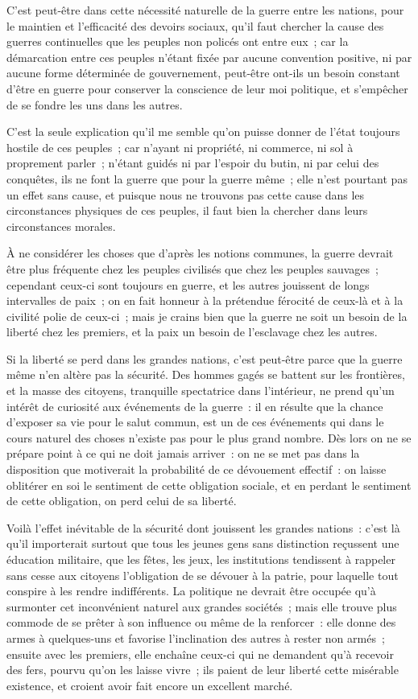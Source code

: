\documentclass[french,twoside]{book} %
\begin{document}
C’est peut-être dans cette nécessité naturelle de la guerre entre les nations, pour le maintien et l’efficacité des devoirs sociaux, qu’il faut chercher la cause des guerres continuelles que les peuples non policés ont entre eux ; car la démarcation entre ces peuples n’étant fixée par aucune convention positive, ni par aucune forme déterminée de gouvernement, peut-être ont-ils un besoin constant d’être en guerre pour conserver la conscience de leur moi politique, et s’empêcher de se fondre les uns dans les autres.\par
C’est la seule explication qu’il me semble qu’on puisse donner de l’état toujours hostile de ces peuples ; car n’ayant ni propriété, ni commerce, ni sol à proprement parler ; n’étant guidés ni par l’espoir du butin, ni par celui des conquêtes, ils ne font la guerre que pour la guerre même ; elle n’est pourtant pas un effet sans cause, et puisque nous ne trouvons pas cette cause dans les circonstances physiques de ces peuples, il faut bien la chercher dans leurs circonstances morales.\par
À ne considérer les choses que d’après les notions communes, la guerre devrait être plus fréquente chez les peuples civilisés que chez les peuples sauvages ; cependant ceux-ci sont toujours en guerre, et les autres jouissent de longs intervalles de paix ; on en fait honneur à la prétendue férocité de ceux-là et à la civilité polie de ceux-ci ; mais je crains bien que la guerre ne soit un besoin de la liberté chez les premiers, et la paix un besoin de l’esclavage chez les autres.\par
Si la liberté se perd dans les grandes nations, c’est peut-être parce que la guerre même n’en altère pas la sécurité. Des hommes gagés se battent sur les frontières, et la masse des citoyens, tranquille spectatrice dans l’intérieur, ne prend qu’un intérêt de curiosité aux événements de la guerre : il en résulte que la chance d’exposer sa vie pour le salut commun, est un de ces événements qui dans le cours naturel des choses n’existe pas pour le plus grand nombre. Dès lors on ne se prépare point à ce qui ne doit jamais arriver : on ne se met pas dans la disposition que motiverait la probabilité de ce dévouement effectif : on laisse oblitérer en soi le sentiment de cette obligation sociale, et en perdant le sentiment de cette obligation, on perd celui de sa liberté.\par
Voilà l’effet inévitable de la sécurité dont jouissent les grandes nations : c’est là qu’il importerait surtout que tous les jeunes gens sans distinction reçussent une éducation militaire, que les fêtes, les jeux, les institutions tendissent à rappeler sans cesse aux citoyens l’obligation de se dévouer à la patrie, pour laquelle tout conspire à les rendre indifférents. La politique ne devrait être occupée qu’à surmonter cet inconvénient naturel aux grandes sociétés ; mais elle trouve plus commode de se prêter à son influence ou même de la renforcer : elle donne des armes à quelques-uns et favorise l’inclination des autres à rester non armés ; ensuite avec les premiers, elle enchaîne ceux-ci qui ne demandent qu’à recevoir des fers, pourvu qu’on les laisse vivre ; ils paient de leur liberté cette misérable existence, et croient avoir fait encore un excellent marché.\par
\end{document}
